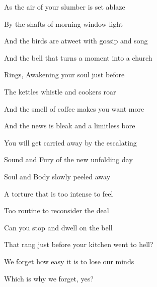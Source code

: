 \documentclass{article}
\begin{document}
\newline

As the air of your slumber is set ablaze 
\newline

By the shafts of morning window light 
\newline

And the birds are atweet with gossip and song
\newline

And the bell that turns a moment into a church 
\newline
\newline

Rings, Awakening your soul just before 
\newline

The kettles whistle and cookers roar 
\newline

And the smell of coffee makes you want more
\newline

And the news is bleak and a limitless bore 
\newline
\newline

You will get carried away by the escalating
\newline

Sound and Fury of the new unfolding day 
\newline

Soul and Body slowly peeled away 
\newline

A torture that is too intense to feel 
\newline

Too routine to reconsider the deal 
\newline \newline

Can you stop and dwell on the bell
\newline

That rang just before your kitchen went to hell?
\newline
\newline

We forget how easy it is to lose our minds \newline

Which is why we forget, yes? \newline
\newline
\end{document}
